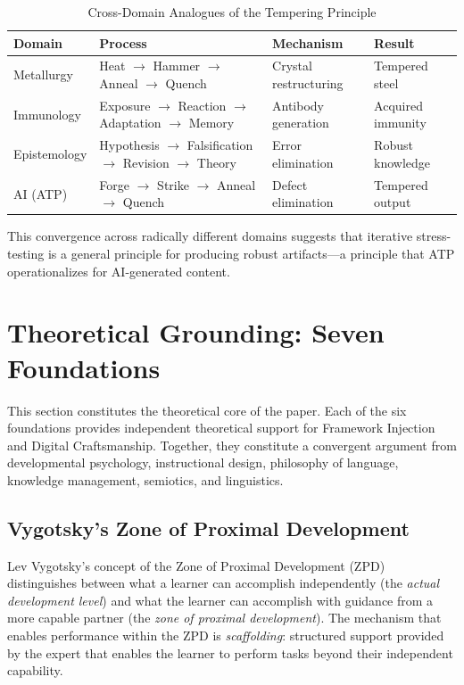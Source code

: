 \documentclass[12pt,a4paper]{article}
\begin{document}
\begin{table}[H]
\centering
\caption{Cross-Domain Analogues of the Tempering Principle}
\label{tab:analogues}
\begin{tabular}{@{}llll@{}}
\toprule
\textbf{Domain} & \textbf{Process} & \textbf{Mechanism} & \textbf{Result} \\
\midrule
Metallurgy & Heat $\to$ Hammer $\to$ Anneal $\to$ Quench & Crystal restructuring & Tempered steel \\
Immunology & Exposure $\to$ Reaction $\to$ Adaptation $\to$ Memory & Antibody generation & Acquired immunity \\
Epistemology & Hypothesis $\to$ Falsification $\to$ Revision $\to$ Theory & Error elimination & Robust knowledge \\
AI (ATP) & Forge $\to$ Strike $\to$ Anneal $\to$ Quench & Defect elimination & Tempered output \\
\bottomrule
\end{tabular}
\end{table}

This convergence across radically different domains suggests that iterative stress-testing is a general principle for producing robust artifacts---a principle that ATP operationalizes for AI-generated content.


\section{Theoretical Grounding: Seven Foundations}
\label{sec:theory}

This section constitutes the theoretical core of the paper. Each of the six foundations provides independent theoretical support for Framework Injection and Digital Craftsmanship. Together, they constitute a convergent argument from developmental psychology, instructional design, philosophy of language, knowledge management, semiotics, and linguistics.

\subsection{Vygotsky's Zone of Proximal Development}

Lev Vygotsky's concept of the Zone of Proximal Development (ZPD) \cite{vygotsky1978} distinguishes between what a learner can accomplish independently (the \emph{actual development level}) and what the learner can accomplish with guidance from a more capable partner (the \emph{zone of proximal development}). The mechanism that enables performance within the ZPD is \emph{scaffolding}: structured support provided by the expert that enables the learner to perform tasks beyond their independent capability.
\end{document}
